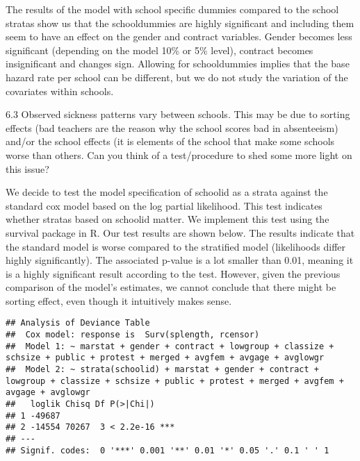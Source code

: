 \documentclass[
]{article}
\begin{document}
The results of the model with school specific dummies compared to the
school stratas show us that the schooldummies are highly significant and
including them seem to have an effect on the gender and contract
variables. Gender becomes less significant (depending on the model 10\%
or 5\% level), contract becomes insignificant and changes sign. Allowing
for schooldummies implies that the base hazard rate per school can be
different, but we do not study the variation of the covariates within
schools.

\clearpage

6.3 Observed sickness patterns vary between schools. This may be due to
sorting effects (bad teachers are the reason why the school scores bad
in absenteeism) and/or the school effects (it is elements of the school
that make some schools worse than others. Can you think of a
test/procedure to shed some more light on this issue?

We decide to test the model specification of schoolid as a strata
against the standard cox model based on the log partial likelihood. This
test indicates whether stratas based on schoolid matter. We implement
this test using the survival package in R. Our test results are shown
below. The results indicate that the standard model is worse compared to
the stratified model (likelihoods differ highly significantly). The
associated p-value is a lot smaller than 0.01, meaning it is a highly
significant result according to the test. However, given the previous
comparison of the model's estimates, we cannot conclude that there might
be sorting effect, even though it intuitively makes sense.

\begin{verbatim}
## Analysis of Deviance Table
##  Cox model: response is  Surv(splength, rcensor)
##  Model 1: ~ marstat + gender + contract + lowgroup + classize + schsize + public + protest + merged + avgfem + avgage + avglowgr
##  Model 2: ~ strata(schoolid) + marstat + gender + contract + lowgroup + classize + schsize + public + protest + merged + avgfem + avgage + avglowgr
##   loglik Chisq Df P(>|Chi|)    
## 1 -49687                       
## 2 -14554 70267  3 < 2.2e-16 ***
## ---
## Signif. codes:  0 '***' 0.001 '**' 0.01 '*' 0.05 '.' 0.1 ' ' 1
\end{verbatim}
\end{document}
